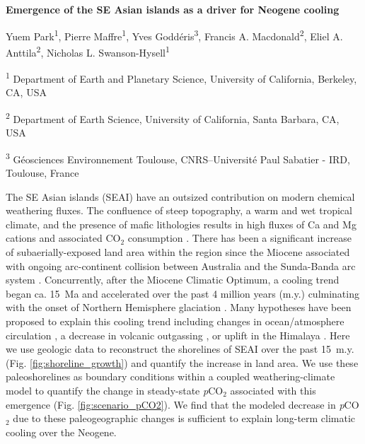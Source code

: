 \documentclass[11pt,letterpaper]{article}
\newcommand{\pCOtwo}{\textit{p}CO$_{2}$\xspace}
\newcommand{\COtwo}{CO$_{2}$\xspace}
\begin{document}
\begin{flushleft}
{\Large \textbf{Emergence of the SE Asian islands as a driver for Neogene cooling}}

Yuem Park\textsuperscript{1},
Pierre Maffre\textsuperscript{1},
Yves Godd\'eris\textsuperscript{3},
Francis A. Macdonald\textsuperscript{2},
Eliel A. Anttila\textsuperscript{2},
Nicholas L. Swanson-Hysell\textsuperscript{1}

\bigskip
\textsuperscript{1} Department of Earth and Planetary Science, University of California, Berkeley, CA, USA

\textsuperscript{2} Department of Earth Science, University of California, Santa Barbara, CA, USA

\textsuperscript{3} G\'eosciences Environnement Toulouse, CNRS--Universit\'e Paul Sabatier - IRD, Toulouse, France

\bigskip

\end{flushleft}

\linenumbers

The SE Asian islands (SEAI) have an outsized contribution on modern chemical weathering fluxes. The confluence of steep topography, a warm and wet tropical climate, and the presence of mafic lithologies results in high fluxes of Ca and Mg cations and associated \COtwo consumption \cite{Gaillardet1999a, Hartmann2009a, Milliman2013a, Hartmann2014a}. There has been a significant increase of subaerially-exposed land area within the region since the Miocene associated with ongoing arc-continent collision between Australia and the Sunda-Banda arc system \cite{Molnar2015a, Hall2017a, Macdonald2019a}. Concurrently, after the Miocene Climatic Optimum, a cooling trend began ca. 15~Ma and accelerated over the past 4 million years (m.y.) culminating with the onset of Northern Hemisphere glaciation \cite{Shackleton1984a, Zachos2001a}. Many hypotheses have been proposed to explain this cooling trend including changes in ocean/atmosphere circulation \cite{Haug1998a, Shevenell2004a, Molnar2015a}, a decrease in volcanic outgassing \cite{Berner1983a}, or uplift in the Himalaya \cite{Raymo1988a}. Here we use geologic data to reconstruct the shorelines of SEAI over the past 15~m.y. (Fig. \ref{fig:shoreline_growth}) and quantify the increase in land area. We use these paleoshorelines as boundary conditions within a coupled weathering-climate model to quantify the change in steady-state \pCOtwo associated with this emergence (Fig. \ref{fig:scenario_pCO2}). We find that the modeled decrease in \pCOtwo due to these paleogeographic changes is sufficient to explain long-term climatic cooling over the Neogene.
\end{document}
